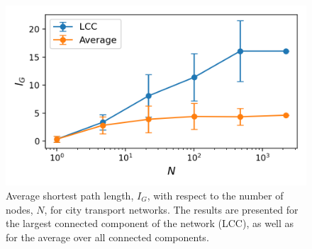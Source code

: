 \begin{figure}[!h]
	\begin{center}
	\includegraphics[scale=0.75]{./images/task_41/avg_path_length_cities.png} 
	\end{center}
	\caption{Average shortest path length, $I_G$, with respect to the number of nodes, $N$, for city transport networks. The results are presented for the largest connected component of the network (LCC), as well as for the average over all connected components. \\} 
	\label{fig:avg_path_length_cities} 
\end{figure}


\newpage
